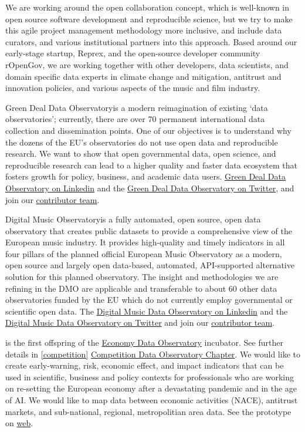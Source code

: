 \documentclass[
  a4paper,
  openany, a4paper, oneside]{book}
\begin{document}
We are working around the open collaboration concept, which is well-known in open source software development and reproducible science, but we try to make this agile project management methodology more inclusive, and include data curators, and various institutional partners into this approach. Based around our early-stage startup, Reprex, and the open-source developer community rOpenGov, we are working together with other developers, data scientists, and domain specific data experts in climate change and mitigation, antitrust and innovation policies, and various aspects of the music and film industry.

Green Deal Data Observatoryis a modern reimagination of existing `data observatories'; currently, there are over 70 permanent international data collection and dissemination points. One of our objectives is to understand why the dozens of the EU's observatories do not use open data and reproducible research. We want to show that open governmental data, open science, and reproducible research can lead to a higher quality and faster data ecosystem that fosters growth for policy, business, and academic data users. \href{https://www.linkedin.com/company/78556699}{Green Deal Data Observatory on Linkedin} and the \href{https://twitter.com/GreenDealObs}{Green Deal Data Observatory on Twitter}, and join our \href{https://greendeal.dataobservatory.eu/\#contributors}{contributor team}.

Digital Music Observatoryis a fully automated, open source, open data observatory that creates public datasets to provide a comprehensive view of the European music industry. It provides high-quality and timely indicators in all four pillars of the planned official European Music Observatory as a modern, open source and largely open data-based, automated, API-supported alternative solution for this planned observatory. The insight and methodologies we are refining in the DMO are applicable and transferable to about 60 other data observatories funded by the EU which do not currently employ governmental or scientific open data. The \href{https://www.linkedin.com/company/79286750/}{Digital Music Data Observatory on Linkedin} and the \href{https://twitter.com/DigitalMusicObs}{Digital Music Data Observatory on Twitter} and join our \href{https://music.dataobservatory.eu/\#contributors}{contributor team}.

is the first offspring of the \href{https://economy.dataobservatory.eu/}{Economy Data Observatory} incubator. See further details in \ref{competition} \protect\hyperlink{competition}{Competition Data Observatory Chapter}. We would like to create early-warning, risk, economic effect, and impact indicators that can be used in scientific, business and policy contexts for professionals who are working on re-setting the European economy after a devastating pandemic and in the age of AI. We would like to map data between economic activities (NACE), antitrust markets, and sub-national, regional, metropolitian area data. See the prototype on \href{https://competition-data-observatory.netlify.app/}{web}.
\end{document}
